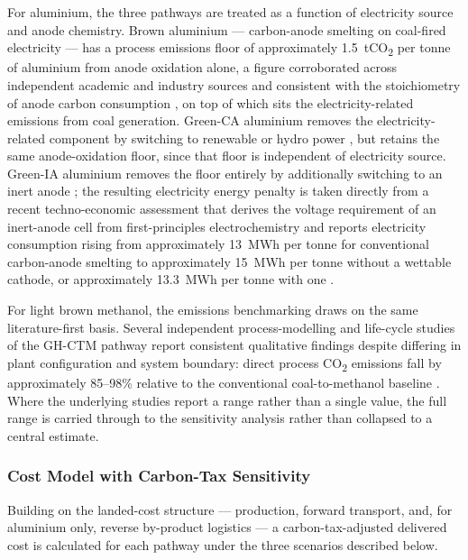 \documentclass[12pt]{article}
\begin{document}
For aluminium, the three pathways are treated as a function of electricity source 
and anode chemistry. Brown aluminium --- carbon-anode smelting on coal-fired 
electricity --- has a process emissions floor of approximately 
1.5~tCO\textsubscript{2} per tonne of aluminium from anode oxidation alone, a 
figure corroborated across independent academic and industry sources and 
consistent with the stoichiometry of anode carbon consumption 
\cite{dardor-aluminium-decarbonisation}, on top of which sits the 
electricity-related emissions from coal generation. Green-CA aluminium removes 
the electricity-related component by switching to renewable or hydro power 
\cite{dc-aluminium-basic,dc-aluminium-scaling}, but retains the same 
anode-oxidation floor, since that floor is independent of electricity source. 
Green-IA aluminium removes the floor entirely by additionally switching to an 
inert anode \cite{aluminium-inert-anodes,inert-anode-scaling}; the resulting 
electricity energy penalty is taken directly from a recent techno-economic 
assessment that derives the voltage requirement of an inert-anode cell from 
first-principles electrochemistry and reports electricity consumption rising 
from approximately 13~MWh per tonne for conventional carbon-anode smelting to 
approximately 15~MWh per tonne without a wettable cathode, or approximately 
13.3~MWh per tonne with one \cite{boudreau-aluminium-tea}.

For light brown methanol, the emissions benchmarking draws on the same 
literature-first basis. Several independent process-modelling and life-cycle 
studies of the GH-CTM pathway report consistent qualitative findings despite 
differing in plant configuration and system boundary: direct process 
CO\textsubscript{2} emissions fall by approximately 85--98\% relative to the 
conventional coal-to-methanol baseline 
\cite{fuel-cells-works-inner-mongolia,wang-coal-to-methanol,zhao-coal-to-methanol}. 
Where the underlying studies report a range rather than a single value, the full 
range is carried through to the sensitivity analysis rather than collapsed to a 
central estimate.

\subsubsection*{Cost Model with Carbon-Tax Sensitivity}

Building on the landed-cost structure --- production, forward transport, and, for 
aluminium only, reverse by-product logistics --- a carbon-tax-adjusted delivered 
cost is calculated for each pathway under the three scenarios described 
below.
\end{document}
